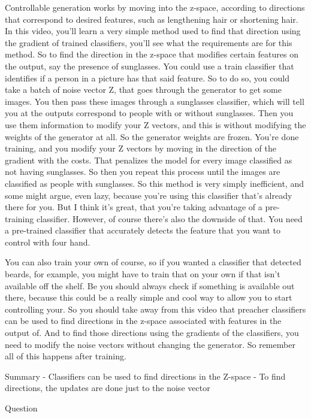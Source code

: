 \documentclass[11pt, onecolumn]{article}
\begin{document}
Controllable generation works by moving into the z-space, according to directions that
correspond to desired features, such as lengthening hair or shortening hair.
In this video, you'll learn a very simple method used to find that direction using
the gradient of trained classifiers, you'll see what the requirements are for
this method.
So to find the direction in the z-space that modifies certain features on
the output, say the presence of sunglasses.
You could use a train classifier that identifies if a person in a picture has
that said feature.
So to do so, you could take a batch of noise vector Z,
that goes through the generator to get some images.
You then pass these images through a sunglasses classifier, which will tell you
at the outputs correspond to people with or without sunglasses.
Then you use them information to modify your Z vectors, and
this is without modifying the weights of the generator at all.
So the generator weights are frozen.
You're done training, and
you modify your Z vectors by moving in the direction of the gradient with the costs.
That penalizes the model for every image classified as not having sunglasses.
So then you repeat this process until the images are classified as people
with sunglasses.
So this method is very simply inefficient, and some might argue, even lazy,
because you're using this classifier that's already there for you.
But I think it's great, that you're taking advantage of a pre-training classifier.
However, of course there's also the downside of that.
You need a pre-trained classifier that accurately detects the feature that you
want to control with four hand.

You can also train your own of course, so if you wanted a classifier that detected beards, for example,
you might have to train that on your own if that isn't available off the shelf.
Be you should always check if something is available out there, because this could be
a really simple and cool way to allow you to start controlling your.
So you should take away from this video that preacher classifiers can be used to
find directions in the z-space associated with features in the output of.
And to find those directions using the gradients of the classifiers,
you need to modify the noise vectors without changing the generator.
So remember all of this happens after training. 

Summary
- Classifiers can be used to find directions in the Z-space
- To find directions, the updates are done just to the noise vector

Question
\end{document}
